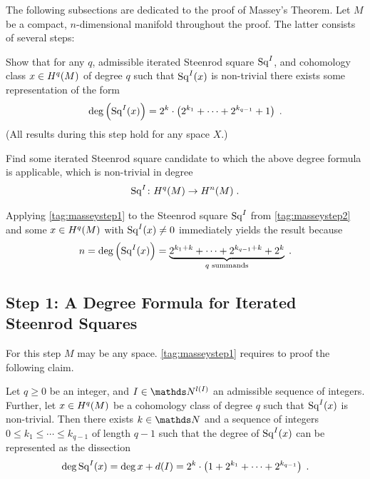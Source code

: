 The following subsections are dedicated to the proof of Massey's Theorem.
Let $M$ be a compact, $n$-dimensional manifold throughout the proof.
The latter consists of several steps:
\begin{steps}
\item\label{tag:masseystep1} 
  Show that for any $q$, admissible iterated Steenrod square $\mathrm{Sq}^{I}$, and cohomology
  class $x\in H^q(M)$ of degree $q$ such that $\mathrm{Sq}^{I}(x)$ is non-trivial there exists
  some representation of the form
  \begin{gather*}
    \deg \left(\mathrm{Sq}^{I}(x)\right)
    = 2^k\cdot
    \left( 2^{k_1}+\dotsb+2^{k_{q-1}} + 1 \right)
    \;.
  \end{gather*}
  (All results during this step hold for any space $X$.)
\item\label{tag:masseystep2}
  Find some iterated Steenrod square candidate to which the above
  degree formula is applicable, \idest which is non-trivial in
  degree
  \begin{gather*}
    \mathrm{Sq}^{I}\colon H^q(M)\to H^n(M)
    \;.
  \end{gather*}
\end{steps}
Applying \ref{tag:masseystep1} to the Steenrod square $\mathrm{Sq}^{I}$ from
\ref{tag:masseystep2} and some $x\in H^q(M)$ with $\mathrm{Sq}^{I}(x)\neq 0$
immediately yields the result because
\begin{gather*}
  n = \deg\left(\mathrm{Sq}^{I}(x)\right) = \underbrace
  {2^{k_1+k}+\dotsb+2^{k_{q-1}+k} + 2^{k}}_{\text{$q$ summands}}
  \;.
\end{gather*}

\subsection[A Degree Formula for Iterated Steenrod Squares]
{Step 1: A Degree Formula for Iterated Steenrod Squares}
For this step $M$ may be any space.
\ref{tag:masseystep1} requires to proof the following claim.
\begin{Lem}[\ref{tag:masseystep1}]\label{lem:masseystep1}
  Let $q\geq 0$ be an integer,
  and $I\in\Nat^{\l(I)}$ an admissible sequence of integers.
  Further, let $x\in H^q(M)$ be a cohomology class of degree $q$
  such that $\mathrm{Sq}^{I}(x)$ is non-trivial.
  Then there exists $k\in\Nat$ and a sequence of integers
  $0\leq k_1\leq\dotsb\leq k_{q-1}$ of length $q-1$ such that the
  degree of $\mathrm{Sq}^{I}(x)$ can be represented as the dissection
  \begin{gather*}
    \deg \mathrm{Sq}^{I}(x)
    = \deg x + d(I)
    = 2^k\cdot
    \left( 1 + 2^{k_1}+\dotsb+2^{k_{q-1}} \right)
    \;.
  \end{gather*}
\end{Lem}

